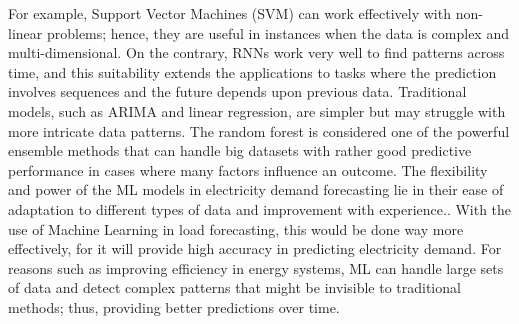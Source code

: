 \documentclass[12pt, a4paper,twoside]{report}
\theoremstyle{plain} %
\theoremstyle{definition} %
\theoremstyle{remark} %
\numberwithin{equation}{chapter}
\begin{document}
For example, Support Vector Machines (SVM) can work effectively with non-linear problems; hence, they are useful in instances when the data is complex and multi-dimensional. On the contrary, RNNs work very well to find patterns across time, and this suitability extends the applications to tasks where the prediction involves sequences and the future depends upon previous data. Traditional models, such as ARIMA and linear regression, are simpler but may struggle with more intricate data patterns. The random forest is considered one of the powerful ensemble methods that can handle big datasets with rather good predictive performance in cases where many factors influence an outcome.
The flexibility and power of the ML models in electricity demand forecasting lie in their ease of adaptation to different types of data and improvement with experience.\cite{sapankevych2009time,gers2000learning}.
With the use of Machine Learning in load forecasting, this would be done way more effectively, for it will provide high accuracy in predicting electricity demand. For reasons such as improving efficiency in energy systems, ML can handle large sets of data and detect complex patterns that might be invisible to traditional methods; thus, providing better predictions over time.
\end{document}

